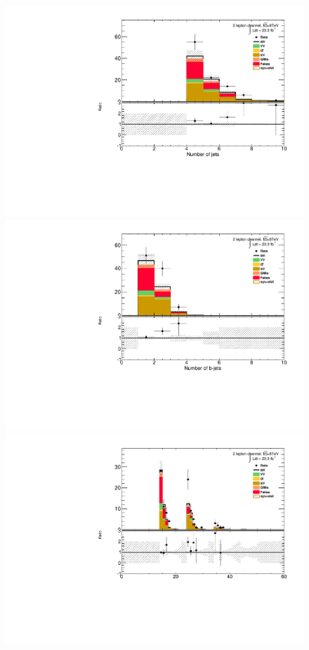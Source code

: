 \begin{figure}[!htbp]
  \begin{minipage}[h]{0.5\textwidth}
    \centering \includegraphics[width=\textwidth]{figs/results/plotCand_2lep_NJet}
  \end{minipage}\hfill
  \begin{minipage}[h]{0.5\textwidth}
    \centering \includegraphics[width=\textwidth]{figs/results/plotCand_2lep_NJetBTag}
  \end{minipage}\hfill
  \begin{minipage}[h]{0.5\textwidth}
    \centering \includegraphics[width=\textwidth]{figs/results/plotCand_2lep_NJet10}

\end{minipage}
\end{figure}
